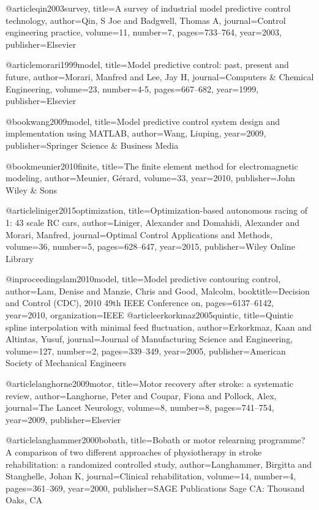 @article{qin2003survey,
  title={A survey of industrial model predictive control technology},
  author={Qin, S Joe and Badgwell, Thomas A},
  journal={Control engineering practice},
  volume={11},
  number={7},
  pages={733--764},
  year={2003},
  publisher={Elsevier}
}

@article{morari1999model,
  title={Model predictive control: past, present and future},
  author={Morari, Manfred and Lee, Jay H},
  journal={Computers \& Chemical Engineering},
  volume={23},
  number={4-5},
  pages={667--682},
  year={1999},
  publisher={Elsevier}
}

@book{wang2009model,
  title={Model predictive control system design and implementation using MATLAB{\textregistered}},
  author={Wang, Liuping},
  year={2009},
  publisher={Springer Science \& Business Media}
}

@book{meunier2010finite,
  title={The finite element method for electromagnetic modeling},
  author={Meunier, G{\'e}rard},
  volume={33},
  year={2010},
  publisher={John Wiley \& Sons}
}

@article{liniger2015optimization,
  title={Optimization-based autonomous racing of 1: 43 scale RC cars},
  author={Liniger, Alexander and Domahidi, Alexander and Morari, Manfred},
  journal={Optimal Control Applications and Methods},
  volume={36},
  number={5},
  pages={628--647},
  year={2015},
  publisher={Wiley Online Library}
}

@inproceedings{lam2010model,
  title={Model predictive contouring control},
  author={Lam, Denise and Manzie, Chris and Good, Malcolm},
  booktitle={Decision and Control (CDC), 2010 49th IEEE Conference on},
  pages={6137--6142},
  year={2010},
  organization={IEEE}
}
@article{erkorkmaz2005quintic,
  title={Quintic spline interpolation with minimal feed fluctuation},
  author={Erkorkmaz, Kaan and Altintas, Yusuf},
  journal={Journal of Manufacturing Science and Engineering},
  volume={127},
  number={2},
  pages={339--349},
  year={2005},
  publisher={American Society of Mechanical Engineers}
}

@article{langhorne2009motor,
  title={Motor recovery after stroke: a systematic review},
  author={Langhorne, Peter and Coupar, Fiona and Pollock, Alex},
  journal={The Lancet Neurology},
  volume={8},
  number={8},
  pages={741--754},
  year={2009},
  publisher={Elsevier}
}

@article{langhammer2000bobath,
  title={Bobath or motor relearning programme? A comparison of two different approaches of physiotherapy in stroke rehabilitation: a randomized controlled study},
  author={Langhammer, Birgitta and Stanghelle, Johan K},
  journal={Clinical rehabilitation},
  volume={14},
  number={4},
  pages={361--369},
  year={2000},
  publisher={SAGE Publications Sage CA: Thousand Oaks, CA}
}

